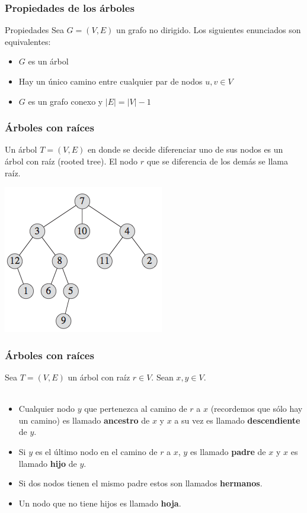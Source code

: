\documentclass{beamer}
\begin{document}
	\begin{frame}
		\frametitle{Propiedades de los árboles}
		\begin{block}{Propiedades}
			Sea $G = (V, E)$ un grafo no dirigido. Los siguientes enunciados son equivalentes:
			\begin{itemize}
				\item $G$ es un árbol
				\item Hay un único camino entre cualquier par de nodos $u, v \in V$
				\item $G$ es un grafo conexo y $|E| = |V| - 1$
			\end{itemize}
		\end{block}
	\end{frame}
	
	\begin{frame}
		\frametitle{Árboles con raíces}
		Un árbol $T = (V, E)$ en donde se decide diferenciar uno de sus nodos es un árbol con raíz (rooted tree). El nodo $r$ que se diferencia de los demás se llama raíz.\\
		\begin{center} \includegraphics[height = 0.55\textheight]{RootedTree.png}  \end{center}
	\end{frame}
	
	\begin{frame}
		\frametitle{Árboles con raíces}
		Sea $T = (V, E)$ un árbol con raíz $r \in V$. Sean $x, y \in V$. \\ \quad \\
		\begin{itemize}
			\item Cualquier nodo $y$ que pertenezca al camino de $r$ a $x$ (recordemos que sólo hay un camino) es llamado \textbf{ancestro} de $x$ y $x$ a su vez es llamado \textbf{descendiente} de $y$.
			\item Si $y$ es el último nodo en el camino de $r$ a $x$, $y$ es llamado \textbf{padre} de $x$ y $x$ es llamado \textbf{hijo} de $y$.
			\item Si dos nodos tienen el mismo padre estos son llamados \textbf{hermanos}.
			\item Un nodo que no tiene hijos es llamado \textbf{hoja}.
		\end{itemize}
	\end{frame}
	
\end{document}
